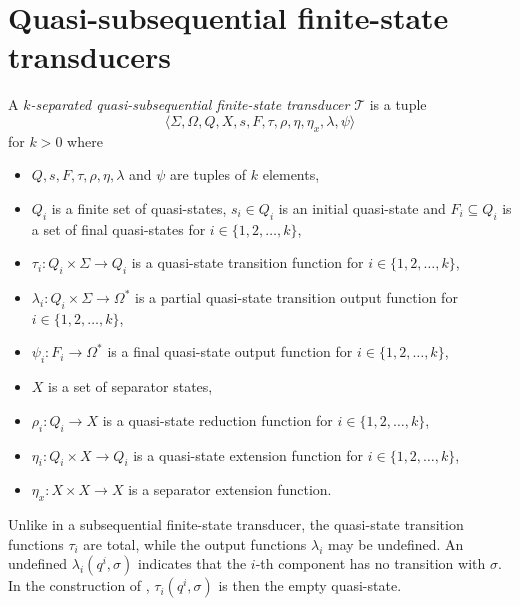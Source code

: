 \section{Quasi-subsequential finite-state transducers}

\begin{definition}
  A \emph{$k$-separated quasi-subsequential finite-state transducer} $\mathcal{T}$ is
  a tuple
  \begin{equation*}
    \langle \Sigma, \Omega, Q, X, s, F, \tau, \rho, \eta, \eta_x, \lambda, \psi
    \rangle
  \end{equation*}
  for $k > 0$ where
  \begin{itemize}
    \item $Q, s, F, \tau, \rho, \eta, \lambda$ and $\psi$ are tuples of $k$ elements,
    \item $Q_i$ is a finite set of quasi-states, $s_i \in Q_i$ is an initial
	    quasi-state and $F_i \subseteq Q_i$ is a set of final quasi-states for $i
	    \in \{ 1, 2, \ldots, k \}$,
    \item $\tau_i : Q_i \times \Sigma \rightarrow Q_i$ is a quasi-state transition
	    function for $i \in \{ 1, 2, \ldots, k \}$,
    \item $\lambda_i : Q_i \times \Sigma \rightarrow \Omega^*$ is a partial
	    quasi-state transition output function for $i \in \{ 1, 2, \ldots, k \}$,
    \item $\psi_i : F_i \rightarrow \Omega^*$ is a final quasi-state output function
	    for $i \in \{ 1, 2, \ldots, k \}$,
    \item $X$ is a set of separator states,
    \item $\rho_i : Q_i \rightarrow X$ is a quasi-state reduction function for $i \in
	    \{ 1, 2, \ldots, k \}$,
    \item $\eta_i : Q_i \times X \rightarrow Q_i$ is a quasi-state extension function
	    for $i \in \{ 1, 2, \ldots, k \}$,
    \item $\eta_x : X \times X \rightarrow X$ is a separator extension function.
  \end{itemize}
\end{definition}

Unlike in a subsequential finite-state transducer, the quasi-state transition functions
$\tau_i$ are total, while the output functions $\lambda_i$ may be undefined. An
undefined $\lambda_i(q^i, \sigma)$ indicates that the $i$-th component has no
transition with $\sigma$. In the construction of
, $\tau_i(q^i, \sigma)$ is then the empty
quasi-state.

